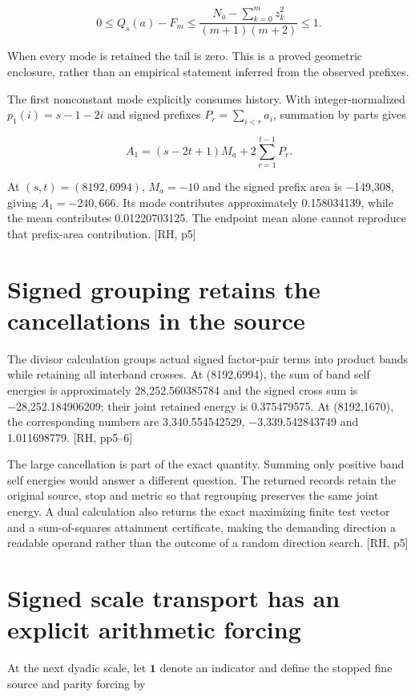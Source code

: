 \[
0\le Q_s(a)-F_m\le\frac{N_a-\sum_{k=0}^{m}z_k^2}{(m+1)(m+2)}\le1.
\]

When every mode is retained the tail is zero. This is a proved geometric enclosure, rather than an empirical statement inferred from the observed prefixes.

The first nonconstant mode explicitly consumes history. With integer-normalized \(p_1(i)=s-1-2i\) and signed prefixes \(P_r=\sum_{i<r}a_i\), summation by parts gives

\[
A_1=(s-2t+1)M_a+2\sum_{r=1}^{t-1}P_r.
\]

At \((s,t)=(8192,6994)\), \(M_a=-10\) and the signed prefix area is −149,308, giving \(A_1=-240{,}666\). Its mode contributes approximately 0.158034139, while the mean contributes 0.01220703125. The endpoint mean alone cannot reproduce that prefix-area contribution. {[}RH, p5{]}

\section{Signed grouping retains the cancellations in the source}\label{signed-grouping-retains-the-cancellations-in-the-source}

The divisor calculation groups actual signed factor-pair terms into product bands while retaining all interband crosses. At (8192,6994), the sum of band self energies is approximately 28,252.560385784 and the signed cross sum is −28,252.184906209; their joint retained energy is 0.375479575. At (8192,1670), the corresponding numbers are 3,340.554542529, −3,339.542843749 and 1.011698779. {[}RH, pp5--6{]}

The large cancellation is part of the exact quantity. Summing only positive band self energies would answer a different question. The returned records retain the original source, stop and metric so that regrouping preserves the same joint energy. A dual calculation also returns the exact maximizing finite test vector and a sum-of-squares attainment certificate, making the demanding direction a readable operand rather than the outcome of a random direction search. {[}RH, p5{]}

\section{Signed scale transport has an explicit arithmetic forcing}\label{signed-scale-transport-has-an-explicit-arithmetic-forcing}

At the next dyadic scale, let \(\mathbf1\) denote an indicator and define the stopped fine source and parity forcing by

